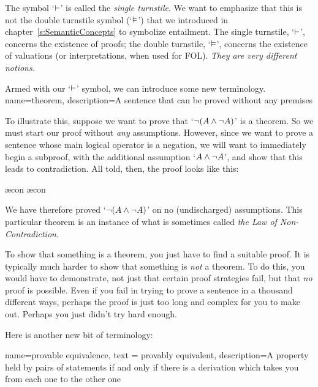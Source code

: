 The symbol `$\vdash$' is called the \emph{single turnstile}. We want to emphasize that this is not the {double turnstile} symbol (`$\vDash$') that we introduced in chapter~\ref{s:SemanticConcepts} to symbolize entailment. The single turnstile, `$\vdash$', concerns the existence of proofs; the double turnstile, `$\vDash$', concerns the existence of valuations (or interpretations, when used for FOL). \emph{They are very different notions.}

Armed with our `$\vdash$' symbol, we can introduce some new terminology.
{
name=theorem,
description={A sentence that can be proved without any premises}
}

        To illustrate this, suppose we want to prove that `$\neg (A \wedge \neg A)$' is a theorem. So we must start our proof without \emph{any} assumptions. However, since we want to prove a sentence whose main logical operator is a negation, we will want to  immediately begin a subproof, with the additional assumption `$A \wedge \neg A$', and show that this leads to contradiction. All told, then, the proof looks like this:
	\begin{pf}
		\open
			\ae{con}
			\ae{con}
		\close
	\end{pf}
We have therefore proved `$\neg (A \wedge \neg A)$' on no (undischarged) assumptions. This particular theorem is an instance of what is sometimes called \emph{the Law of Non-Contradiction}.

To show that something is a theorem, you just have to find a suitable proof. It is typically much harder to show that something is \emph{not} a theorem. To do this, you would have to demonstrate, not just that certain proof strategies fail, but that \emph{no} proof is possible. Even if you fail in trying to prove a sentence in a thousand different ways, perhaps the proof is just too long and complex for you to make out. Perhaps you just didn't try hard enough.

Here is another new bit of terminology:
        
{
  name=provable equivalence,
  text = provably equivalent,
description={A property held by pairs of statements if and only if there is a derivation which takes you from each one to the other one}
}


